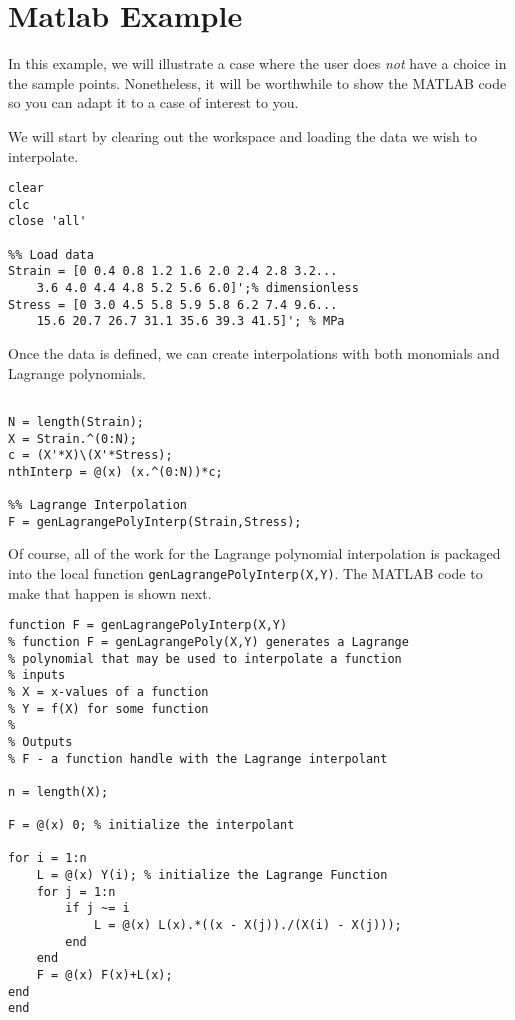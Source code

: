 \section{Matlab Example}
In this example, we will illustrate a case where the user does \emph{not} have a choice in the sample points.  Nonetheless, it will be worthwhile to show the MATLAB code so you can adapt it to a case of interest to you.

We will start by clearing out the workspace and loading the data we wish to interpolate.
\begin{lstlisting}[style=myMatlab,name=lec15n-ex2]
clear
clc
close 'all'

%% Load data
Strain = [0 0.4 0.8 1.2 1.6 2.0 2.4 2.8 3.2...
    3.6 4.0 4.4 4.8 5.2 5.6 6.0]';% dimensionless
Stress = [0 3.0 4.5 5.8 5.9 5.8 6.2 7.4 9.6...
    15.6 20.7 26.7 31.1 35.6 39.3 41.5]'; % MPa
\end{lstlisting}

Once the data is defined, we can create interpolations with both monomials and Lagrange polynomials.  

\begin{lstlisting}[style=myMatlab,name=lec15n-ex2]
%% N-th order Interpolation (monomials)

N = length(Strain);
X = Strain.^(0:N);
c = (X'*X)\(X'*Stress);
nthInterp = @(x) (x.^(0:N))*c;

%% Lagrange Interpolation
F = genLagrangePolyInterp(Strain,Stress);
\end{lstlisting}

Of course, all of the work for the Lagrange polynomial interpolation is packaged into the local function \lstinline[style=myMatlab]{genLagrangePolyInterp(X,Y)}.  The MATLAB code to make that happen is shown next.

\begin{lstlisting}[style=myMatlab,name=lec15n-ex2]
%% Local function for Lagrange polynomial
function F = genLagrangePolyInterp(X,Y)
% function F = genLagrangePoly(X,Y) generates a Lagrange  
% polynomial that may be used to interpolate a function
% inputs
% X = x-values of a function
% Y = f(X) for some function
%
% Outputs
% F - a function handle with the Lagrange interpolant

n = length(X); 

F = @(x) 0; % initialize the interpolant

for i = 1:n
    L = @(x) Y(i); % initialize the Lagrange Function
    for j = 1:n
        if j ~= i
            L = @(x) L(x).*((x - X(j))./(X(i) - X(j)));
        end
    end
    F = @(x) F(x)+L(x);
end
end
\end{lstlisting}

